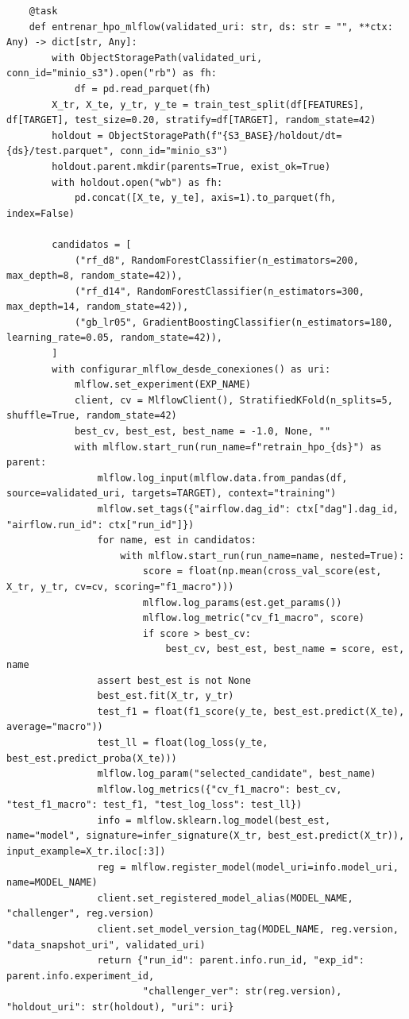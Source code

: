 \begin{lstlisting}
    @task
    def entrenar_hpo_mlflow(validated_uri: str, ds: str = "", **ctx: Any) -> dict[str, Any]:
        with ObjectStoragePath(validated_uri, conn_id="minio_s3").open("rb") as fh:
            df = pd.read_parquet(fh)
        X_tr, X_te, y_tr, y_te = train_test_split(df[FEATURES], df[TARGET], test_size=0.20, stratify=df[TARGET], random_state=42)
        holdout = ObjectStoragePath(f"{S3_BASE}/holdout/dt={ds}/test.parquet", conn_id="minio_s3")
        holdout.parent.mkdir(parents=True, exist_ok=True)
        with holdout.open("wb") as fh:
            pd.concat([X_te, y_te], axis=1).to_parquet(fh, index=False)

        candidatos = [
            ("rf_d8", RandomForestClassifier(n_estimators=200, max_depth=8, random_state=42)),
            ("rf_d14", RandomForestClassifier(n_estimators=300, max_depth=14, random_state=42)),
            ("gb_lr05", GradientBoostingClassifier(n_estimators=180, learning_rate=0.05, random_state=42)),
        ]
        with configurar_mlflow_desde_conexiones() as uri:
            mlflow.set_experiment(EXP_NAME)
            client, cv = MlflowClient(), StratifiedKFold(n_splits=5, shuffle=True, random_state=42)
            best_cv, best_est, best_name = -1.0, None, ""
            with mlflow.start_run(run_name=f"retrain_hpo_{ds}") as parent:
                mlflow.log_input(mlflow.data.from_pandas(df, source=validated_uri, targets=TARGET), context="training")
                mlflow.set_tags({"airflow.dag_id": ctx["dag"].dag_id, "airflow.run_id": ctx["run_id"]})
                for name, est in candidatos:
                    with mlflow.start_run(run_name=name, nested=True):
                        score = float(np.mean(cross_val_score(est, X_tr, y_tr, cv=cv, scoring="f1_macro")))
                        mlflow.log_params(est.get_params())
                        mlflow.log_metric("cv_f1_macro", score)
                        if score > best_cv:
                            best_cv, best_est, best_name = score, est, name
                assert best_est is not None
                best_est.fit(X_tr, y_tr)
                test_f1 = float(f1_score(y_te, best_est.predict(X_te), average="macro"))
                test_ll = float(log_loss(y_te, best_est.predict_proba(X_te)))
                mlflow.log_param("selected_candidate", best_name)
                mlflow.log_metrics({"cv_f1_macro": best_cv, "test_f1_macro": test_f1, "test_log_loss": test_ll})
                info = mlflow.sklearn.log_model(best_est, name="model", signature=infer_signature(X_tr, best_est.predict(X_tr)), input_example=X_tr.iloc[:3])
                reg = mlflow.register_model(model_uri=info.model_uri, name=MODEL_NAME)
                client.set_registered_model_alias(MODEL_NAME, "challenger", reg.version)
                client.set_model_version_tag(MODEL_NAME, reg.version, "data_snapshot_uri", validated_uri)
                return {"run_id": parent.info.run_id, "exp_id": parent.info.experiment_id,
                        "challenger_ver": str(reg.version), "holdout_uri": str(holdout), "uri": uri}


\end{lstlisting}
